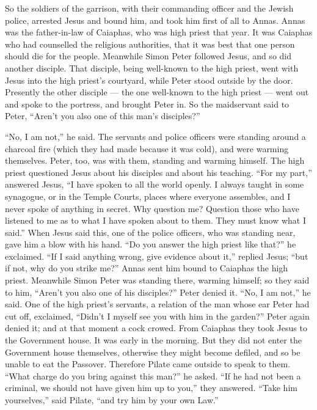  So the soldiers of the garrison, with their commanding
officer and the Jewish police, arrested Jesus and bound him,
 and took him first of all to Annas. Annas was the
father-in-law of Caiaphas, who was high priest that year. 
It was Caiaphas who had counselled the religious authorities, that it
was best that one person should die for the people. 
Meanwhile Simon Peter followed Jesus, and so did another disciple. That
disciple, being well-known to the high priest, went with Jesus into the
high priest's courtyard,  while Peter stood outside by the
door. Presently the other disciple --- the one well-known to the high
priest --- went out and spoke to the portress, and brought Peter in.
 So the maidservant said to Peter, ``Aren't you also one of
this man's disciples?''

``No, I am not,'' he said.  The servants and police
officers were standing around a charcoal fire (which they had made
because it was cold), and were warming themselves. Peter, too, was with
them, standing and warming himself.  The high priest
questioned Jesus about his disciples and about his teaching.
 ``For my part,'' answered Jesus, ``I have spoken to all
the world openly. I always taught in some synagogue, or in the Temple
Courts, places where everyone assembles, and I never spoke of anything
in secret.  Why question me? Question those who have
listened to me as to what I have spoken about to them. They must know
what I said.''  When Jesus said this, one of the police
officers, who was standing near, gave him a blow with his hand. ``Do you
answer the high priest like that?'' he exclaimed.  ``If I
said anything wrong, give evidence about it,'' replied Jesus; ``but if
not, why do you strike me?''  Annas sent him bound to
Caiaphas the high priest.  Meanwhile Simon Peter was
standing there, warming himself; so they said to him, ``Aren't you also
one of his disciples?'' Peter denied it. ``No, I am not,'' he said.
 One of the high priest's servants, a relation of the man
whose ear Peter had cut off, exclaimed, ``Didn't I myself see you with
him in the garden?''  Peter again denied it; and at that
moment a cock crowed.  From Caiaphas they took Jesus to the
Government house. It was early in the morning. But they did not enter
the Government house themselves, otherwise they might become defiled,
and so be unable to eat the Passover.  Therefore Pilate
came outside to speak to them. ``What charge do you bring against this
man?'' he asked.  ``If he had not been a criminal, we
should not have given him up to you,'' they answered. 
``Take him yourselves,'' said Pilate, ``and try him by your own Law.''

